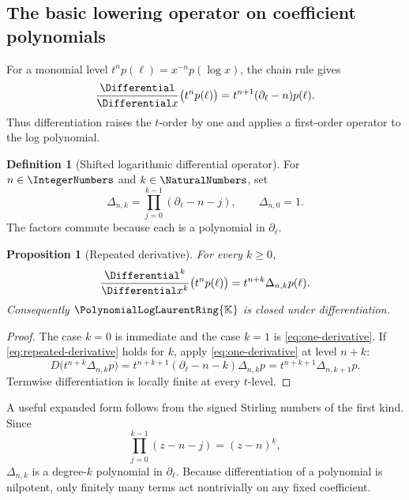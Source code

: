 \documentclass[11pt,oneside]{article}
\numberwithin{equation}{section}
\newtheorem{proposition}[theorem]{Proposition}
\theoremstyle{definition}
\newtheorem{definition}[theorem]{Definition}
\newcommand{\K}{\mathbb{K}}
\newcommand{\PL}{\PolynomialLogLaurentRing{\K}}
\newcommand{\dlog}{\partial_{\ell}}
\begin{document}
\subsection{The basic lowering operator on coefficient polynomials}

For a monomial level \(t^n p(\ell)=x^{-n}p(\log x)\), the chain rule gives
\begin{equation}\label{eq:one-derivative}
  \frac{\Differential}{\Differential x}\bigl(t^n p(\ell)\bigr)
  =t^{n+1}(\dlog-n)p(\ell).
\end{equation}
Thus differentiation raises the \(t\)-order by one and applies a first-order
operator to the log polynomial.

\begin{definition}[Shifted logarithmic differential operator]
For \(n\in\IntegerNumbers\) and \(k\in\NaturalNumbers\), set
\begin{equation}\label{eq:Delta-def}
  \Delta_{n,k}
  =\prod_{j=0}^{k-1}(\dlog-n-j),
  \qquad \Delta_{n,0}=1.
\end{equation}
The factors commute because each is a polynomial in \(\dlog\).
\end{definition}

\begin{proposition}[Repeated derivative]\label{prop:repeated-derivative}
For every \(k\ge0\),
\begin{equation}\label{eq:repeated-derivative}
  \frac{\Differential^k}{\Differential x^k}\bigl(t^n p(\ell)\bigr)
  =t^{n+k}\Delta_{n,k}p(\ell).
\end{equation}
Consequently \(\PL\) is closed under differentiation.
\end{proposition}

\begin{proof}
The case \(k=0\) is immediate and the case \(k=1\) is
\eqref{eq:one-derivative}.  If \eqref{eq:repeated-derivative} holds for \(k\),
apply \eqref{eq:one-derivative} at level \(n+k\):
\[
 D\bigl(t^{n+k}\Delta_{n,k}p\bigr)
 =t^{n+k+1}(\dlog-n-k)\Delta_{n,k}p
 =t^{n+k+1}\Delta_{n,k+1}p.
\]
Termwise differentiation is locally finite at every \(t\)-level.
\end{proof}

A useful expanded form follows from the signed Stirling numbers of the first
kind.  Since
\[
  \prod_{j=0}^{k-1}(z-n-j)=(z-n)^{\underline{k}},
\]
\(\Delta_{n,k}\) is a degree-\(k\) polynomial in \(\dlog\).  Because differentiation
of a polynomial is nilpotent, only finitely many terms act nontrivially on any
fixed coefficient.
\end{document}
